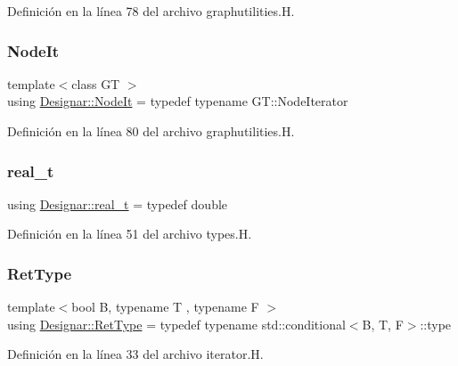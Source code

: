 Definición en la línea 78 del archivo graphutilities.\+H.

\mbox{\label{namespace_designar_a5fdef28ed7c6b948482379ebabf927ce}} 
\subsubsection{\texorpdfstring{Node\+It}{NodeIt}}
{\footnotesize\ttfamily template$<$class GT $>$ \\
using \hyperlink{namespace_designar_a5fdef28ed7c6b948482379ebabf927ce}{Designar\+::\+Node\+It} = typedef typename G\+T\+::\+Node\+Iterator}



Definición en la línea 80 del archivo graphutilities.\+H.

\mbox{\label{namespace_designar_aca2c32af26808dbec1f3a3071fad25ce}} 
\subsubsection{\texorpdfstring{real\+\_\+t}{real\_t}}
{\footnotesize\ttfamily using \hyperlink{namespace_designar_aca2c32af26808dbec1f3a3071fad25ce}{Designar\+::real\+\_\+t} = typedef double}



Definición en la línea 51 del archivo types.\+H.

\mbox{\label{namespace_designar_ab937f9c4bf5f1d0e65dbc616245d50ee}} 
\subsubsection{\texorpdfstring{Ret\+Type}{RetType}}
{\footnotesize\ttfamily template$<$bool B, typename T , typename F $>$ \\
using \hyperlink{namespace_designar_ab937f9c4bf5f1d0e65dbc616245d50ee}{Designar\+::\+Ret\+Type} = typedef typename std\+::conditional$<$B, T, F$>$\+::type}



Definición en la línea 33 del archivo iterator.\+H.

